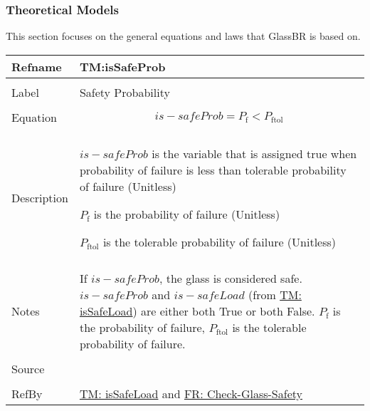 \documentclass[12pt]{article}
\begin{document}
\subsubsection{Theoretical Models}
\label{Sec:TMs}
This section focuses on the general equations and laws that GlassBR is based on.

\vspace{\baselineskip}
\noindent
\begin{minipage}{\textwidth}
\begin{tabular}{>{\raggedright}p{}>{\raggedright\arraybackslash}p{}}
\toprule \textbf{Refname} & \textbf{TM:isSafeProb}
\label{TM:isSafeProb}
\\ \midrule \\
Label & Safety Probability
        
\\ \midrule \\
Equation & \begin{displaymath}
           is-safeProb={P_{\text{f}}}<{P_{\text{f}\text{tol}}}
           \end{displaymath}
\\ \midrule \\
Description & \begin{symbDescription}
              \item{$is-safeProb$ is the variable that is assigned true when probability of failure is less than tolerable probability of failure (Unitless)}
              \item{${P_{\text{f}}}$ is the probability of failure (Unitless)}
              \item{${P_{\text{f}\text{tol}}}$ is the tolerable probability of failure (Unitless)}
              \end{symbDescription}
\\ \midrule \\
Notes & If $is-safeProb$, the glass is considered safe. $is-safeProb$ and $is-safeLoad$ (from \hyperref[TM:isSafeLoad]{TM: isSafeLoad}) are either both True or both False. ${P_{\text{f}}}$ is the probability of failure, ${P_{\text{f}\text{tol}}}$ is the tolerable probability of failure.
        
\\ \midrule \\
Source & \cite{astm2009}
         
\\ \midrule \\
RefBy & \hyperref[TM:isSafeLoad]{TM: isSafeLoad} and \hyperref[checkGlassSafety]{FR: Check-Glass-Safety}
        
\\ \bottomrule
\end{tabular}
\end{minipage}
\end{document}
